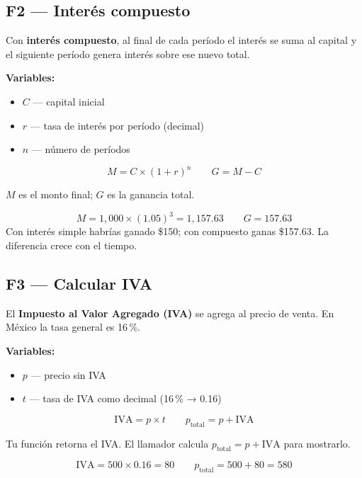 \documentclass[12pt, oneside]{article}
\begin{document}
\subsection{F2 — Interés compuesto}

Con \textbf{interés compuesto}, al final de cada período el interés se suma
al capital y el siguiente período genera interés sobre ese nuevo total.

\textbf{Variables:}
\begin{itemize}
  \item $C$ — capital inicial
  \item $r$ — tasa de interés por período (decimal)
  \item $n$ — número de períodos
\end{itemize}

\[
  M = C \times (1 + r)^{n}
  \qquad
  G = M - C
\]

$M$ es el monto final; $G$ es la ganancia total.

\begin{ejemplo}
  \[
    M = 1{,}000 \times (1.05)^{3} = 1{,}157.63
    \qquad
    G = 157.63
  \]
  Con interés simple habrías ganado \$150; con compuesto ganas \$157.63.
  La diferencia crece con el tiempo.
\end{ejemplo}

\subsection{F3 — Calcular IVA}

El \textbf{Impuesto al Valor Agregado (IVA)} se agrega al precio de venta.
En México la tasa general es 16\,\%.

\textbf{Variables:}
\begin{itemize}
  \item $p$ — precio sin IVA
  \item $t$ — tasa de IVA como decimal (16\,\% → 0.16)
\end{itemize}

\[
  \text{IVA} = p \times t
  \qquad
  p_{\text{total}} = p + \text{IVA}
\]

Tu función retorna el IVA.  El llamador calcula $p_{\text{total}} = p + \text{IVA}$
para mostrarlo.

\begin{ejemplo}
  \[
    \text{IVA} = 500 \times 0.16 = 80
    \qquad
    p_{\text{total}} = 500 + 80 = 580
  \]
\end{ejemplo}
\end{document}
